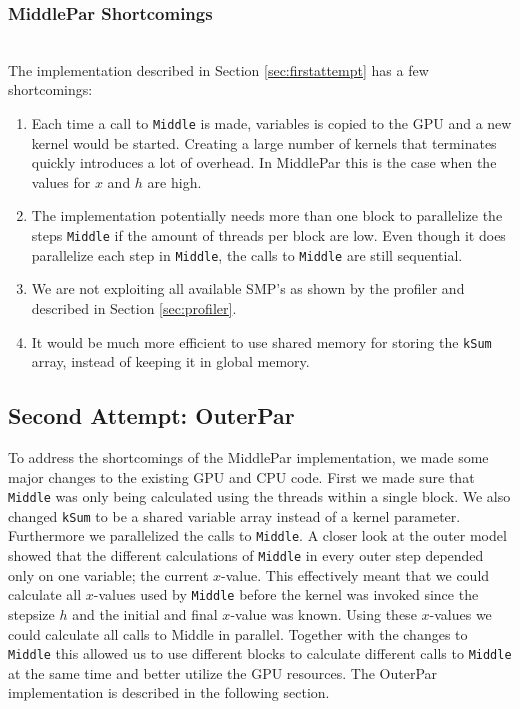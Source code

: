 \subsubsection{MiddlePar Shortcomings} \hfill \\
\label{label:shortages}
The implementation described in Section \ref{sec:firstattempt} has a few shortcomings:
\begin{enumerate}
	\item Each time a call to \texttt{Middle} is made, variables is copied to the GPU and a new kernel would be started. Creating a large number of kernels that terminates quickly introduces a lot of overhead. In MiddlePar this is the case when the values for $x$ and $h$ are high.
	\item The implementation potentially needs more than one block to parallelize the steps \texttt{Middle} if the amount of threads per block are low. Even though it does parallelize each step in \texttt{Middle}, the calls to \texttt{Middle} are still sequential.
	\item We are not exploiting all available SMP's as shown by the profiler and described in Section \ref{sec:profiler}.
	\item It would be much more efficient to use shared memory for storing the \texttt{kSum} array, instead of keeping it in global memory.
\end{enumerate}

\subsection{Second Attempt: OuterPar}
To address the shortcomings of the MiddlePar implementation, we made some major changes to the existing GPU and CPU code. First we made sure that \texttt{Middle} was only being calculated using the threads within a single block. We also changed \texttt{kSum} to be a shared variable array instead of a kernel parameter. \\

Furthermore we parallelized the calls to \texttt{Middle}. A closer look at the outer model showed that the different calculations of \texttt{Middle} in every outer step depended only on one variable; the current $x$-value. This effectively meant that we could calculate all $x$-values used by \texttt{Middle} before the kernel was invoked since the stepsize $h$ and the initial and final $x$-value was known. Using these $x$-values we could calculate all calls to Middle in parallel. Together with the changes to \texttt{Middle} this allowed us to use different blocks to calculate different calls to \texttt{Middle} at the same time and better utilize the GPU resources. The OuterPar implementation is described in the following section.

